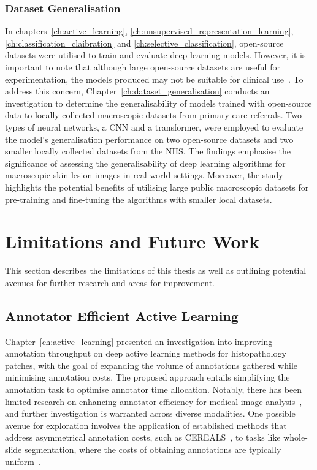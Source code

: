 \subsubsection{Dataset Generalisation}
In chapters~\ref{ch:active_learning}, \ref{ch:unsupervised_representation_learning}, \ref{ch:classification_claibration} and \ref{ch:selective_classification}, open-source datasets were utilised to train and evaluate deep learning models. However, it is important to note that although large open-source datasets are useful for experimentation, the models produced may not be suitable for clinical use~\citep{wu2022skin}. To address this concern, Chapter~\ref{ch:dataset_generalisation} conducts an investigation to determine the generalisability of models trained with open-source data to locally collected macroscopic datasets from primary care referrals. Two types of neural networks, a CNN and a transformer, were employed to evaluate the model’s generalisation performance on two open-source datasets and two smaller locally collected datasets from the NHS. The findings emphasise the significance of assessing the generalisability of deep learning algorithms for macroscopic skin lesion images in real-world settings. Moreover, the study highlights the potential benefits of utilising large public macroscopic datasets for pre-training and fine-tuning the algorithms with smaller local datasets.



\section{Limitations and Future Work}
This section describes the limitations of this thesis as well as outlining potential avenues for further research and areas for improvement.

\subsection{Annotator Efficient Active Learning}
Chapter~\ref{ch:active_learning} presented an investigation into improving annotation throughput on deep active learning methods for histopathology patches, with the goal of expanding the volume of annotations gathered while minimising annotation costs. The proposed approach entails simplifying the annotation task to optimise annotator time allocation. Notably, there has been limited research on enhancing annotator efficiency for medical image analysis~\citep{ren2021survey}, and further investigation is warranted across diverse modalities. One possible avenue for exploration involves the application of established methods that address asymmetrical annotation costs, such as CEREALS~\citep{mackowiak2018cereals}, to tasks like whole-slide segmentation, where the costs of obtaining annotations are typically uniform~\citep{budd2021survey}.

